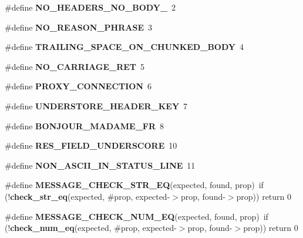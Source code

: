 \begin{DoxyCompactItemize}
\#define {\bf N\+O\+\_\+\+H\+E\+A\+D\+E\+R\+S\+\_\+\+N\+O\+\_\+\+B\+O\+D\+Y\+\_}~2
\item 
\#define {\bf N\+O\+\_\+\+R\+E\+A\+S\+O\+N\+\_\+\+P\+H\+R\+A\+SE}~3
\item 
\#define {\bf T\+R\+A\+I\+L\+I\+N\+G\+\_\+\+S\+P\+A\+C\+E\+\_\+\+O\+N\+\_\+\+C\+H\+U\+N\+K\+E\+D\+\_\+\+B\+O\+DY}~4
\item 
\#define {\bf N\+O\+\_\+\+C\+A\+R\+R\+I\+A\+G\+E\+\_\+\+R\+ET}~5
\item 
\#define {\bf P\+R\+O\+X\+Y\+\_\+\+C\+O\+N\+N\+E\+C\+T\+I\+ON}~6
\item 
\#define {\bf U\+N\+D\+E\+R\+S\+T\+O\+R\+E\+\_\+\+H\+E\+A\+D\+E\+R\+\_\+\+K\+EY}~7
\item 
\#define {\bf B\+O\+N\+J\+O\+U\+R\+\_\+\+M\+A\+D\+A\+M\+E\+\_\+\+FR}~8
\item 
\#define {\bf R\+E\+S\+\_\+\+F\+I\+E\+L\+D\+\_\+\+U\+N\+D\+E\+R\+S\+C\+O\+RE}~10
\item 
\#define {\bf N\+O\+N\+\_\+\+A\+S\+C\+I\+I\+\_\+\+I\+N\+\_\+\+S\+T\+A\+T\+U\+S\+\_\+\+L\+I\+NE}~11
\item 
\#define {\bf M\+E\+S\+S\+A\+G\+E\+\_\+\+C\+H\+E\+C\+K\+\_\+\+S\+T\+R\+\_\+\+EQ}(expected,  found,  prop)~if (!{\bf check\+\_\+str\+\_\+eq}(expected, \#prop, expected-\/$>$prop, found-\/$>$prop)) return 0
\item 
\#define {\bf M\+E\+S\+S\+A\+G\+E\+\_\+\+C\+H\+E\+C\+K\+\_\+\+N\+U\+M\+\_\+\+EQ}(expected,  found,  prop)~if (!{\bf check\+\_\+num\+\_\+eq}(expected, \#prop, expected-\/$>$prop, found-\/$>$prop)) return 0
\end{DoxyCompactItemize}
